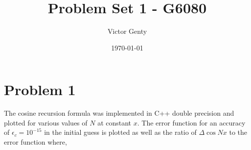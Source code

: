 \documentclass[singlepage,notitlepage,nofootinbib,12pt]{revtex4-1}
\begin{document}
\title{Problem Set 1 - G6080}
\author{Victor Genty}
\date{\today}
\maketitle
\section{Problem 1}
The cosine recursion formula  was implemented in C++ double precision and plotted for various values of $N$ at constant $x$. The error function for an accuracy of $\epsilon_c = 10^{-15}$ in the initial guess is plotted as well as the ratio of $\Delta\cos Nx$ to the error function where,
\end{document}
